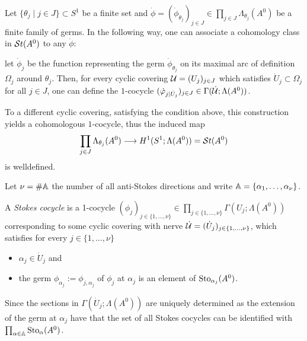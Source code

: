 \begin{rem}\label{rem:mapStoToCocy}
  Let $\{\theta_j\mid j\in J\}\subset S^1$ be a finite set and
  $\dot\phi=(\dot\phi_{\theta_j})_{j\in J}
  \in\prod_{j\in J}\Lambda_{\theta_j}(A^0)$ be a finite family of germs.
  In the following way, one can associate a cohomology class in $\mathcal{S}{}t(A^0)$ to
  any $\dot\phi$:
  \begin{einr}
    let $\dot\phi_j$ be the function representing the germ
    $\dot\phi_{\theta_j}$ on its maximal arc of definition $\Omega_j$ around
    $\theta_j$.
    Then, for every cyclic covering $\mathcal{U}=(U_j)_{j\in J}$ which satisfies
    $\dot U_j\subset \Omega_j$ for all $j\in J$, one can define the $1$-cocycle
    $(\dot{\varphi}_{j|\dot U_j})_{j\in J}\in\Gamma(\dot{\mathcal{U}};\Lambda(A^0))$.
  \end{einr}
  To a different cyclic covering, satisfying the condition above, this
  construction yields a cohomologous $1$-cocycle, thus the induced map
  \[
    \prod_{j\in J}\Lambda_{\theta_j}(A^0)
    \longrightarrow
    H^1(S^1;\Lambda(A^0))=\mathcal{S}{}t(A^0)
  \]
  is welldefined.
  \begin{comment}
    \begin{s-rem}
      Let $\dot\phi=(\dot\phi_{\theta})\in\Lambda_\theta(A^0)$ be a cocycle
      consisting only of an single element, which satisfies that the maximal
      arc of definition $\theta$ has opening less than $2\pi$.
      There can not exist a covering consisting of a single element $U$
      satisfying $U\subset\Omega$ and thus no map \dots
    \end{s-rem}
  \end{comment}
\end{rem}
\begin{defn}\label{defn:stokesCocycle}
  Let $\nu=\#\mathbb{A}$ the number of all anti-Stokes directions and write
  $\mathbb{A}=\{\alpha_1,\dots,\alpha_\nu\}$.

  A \emph{Stokes cocycle} is a 1-cocycle $(\phi_j)_{j\in\{1,\dots,\nu\}}\in
  \prod_{j\in\{1,\dots,\nu\}}\Gamma(U_j;\Lambda(A^0))$ corresponding to some
  cyclic covering with nerve $\dot{\mathcal{U}}=(\dot U_j)_{j\in\{1,\dots,\nu\}}$,
  which satisfies for every $j\in\{1,\dots,\nu\}$
  \begin{itemize}
    \item $\alpha_j\in\dot U_j$ and
    \item the germ $\phi_{\alpha_j}:=\phi_{j,\alpha_j}$ of $\phi_j$ at
      $\alpha_j$ is an element of $\operatorname{Sto}_{\alpha_j}(A^0)$.
  \end{itemize}
  \begin{s-rem}
    Since the sections in $\Gamma(\dot U_j;\Lambda(A^0))$ are uniquely
    determined as the extension of the germ at $\alpha_j$ have that the set of
    all Stokes cocycles can be identified with
    $\prod_{\alpha\in\mathbb{A}}\operatorname{Sto}_\alpha(A^0)$.
  \end{s-rem}
\end{defn}
